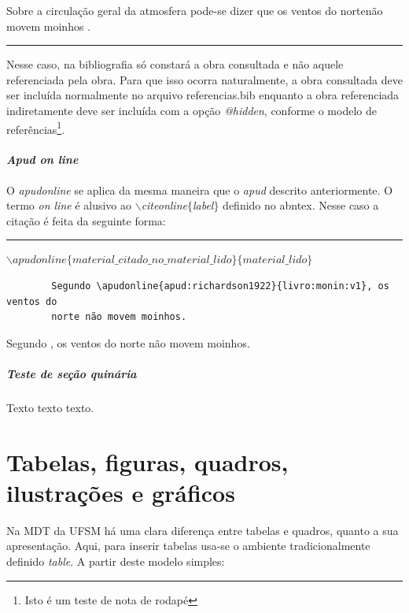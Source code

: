 \documentclass[oneside,openright,12pt]{ufsm_2021} %
\begin{document}
	Sobre a circulação geral da atmosfera pode-se dizer que os ventos do nortenão movem moinhos .
	\begin{center}\rule{0.5\textwidth}{1pt}\end{center}  
	\par Nesse caso, na bibliografia só constará a obra consultada e não aquele referenciada pela obra. Para que isso ocorra naturalmente, a obra consultada deve ser incluída normalmente no arquivo referencias.bib enquanto a obra referenciada indiretamente deve ser incluída com a opção \textit{@hidden}, conforme o modelo de referências\footnote{Isto é um teste de nota de rodapé}.
	
	\subsubsection{\textit{Apud on line}}
	
	
	\par O \textit{apudonline} se aplica da mesma maneira que o \textit{apud} descrito anteriormente. O termo \textit{on line} é alusivo ao \textit{$\backslash$citeonline$\{$label$\}$} definido no abntex. Nesse caso a citação é feita da seguinte forma:
	\begin{center}
		\rule{0.5\textwidth}{1pt}
		$\backslash apudonline\{material\_citado\_no\_material\_lido\}\{material\_lido\}$ \\
	\end{center}
	
	\begin{verbatim}
		Segundo \apudonline{apud:richardson1922}{livro:monin:v1}, os ventos do
		norte não movem moinhos.
	\end{verbatim}
	
	Segundo , os ventos do norte não movem moinhos.
	
	\paragraph{Teste de seção quinária}
	
	\par Texto texto texto.
	
	
	\chapter{Tabelas, figuras, quadros, ilustrações e gráficos}
	
	\par Na MDT da UFSM há uma clara diferença entre tabelas e quadros, quanto a sua apresentação. Aqui, para inserir tabelas usa-se o ambiente tradicionalmente definido \textit{table}. A partir deste modelo simples:
	
\end{document}
